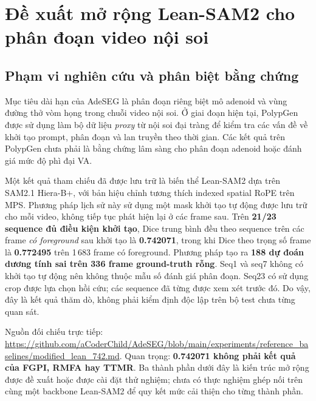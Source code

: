 
\section{Đề xuất mở rộng Lean-SAM2 cho phân đoạn video nội soi}
\label{sec:adeseg-proposed-framework}

\subsection{Phạm vi nghiên cứu và phân biệt bằng chứng}
\label{subsec:adeseg-evidence}

Mục tiêu dài hạn của AdeSEG là phân đoạn riêng biệt mô adenoid và vùng đường
thở vòm họng trong chuỗi video nội soi. Ở giai đoạn hiện tại, PolypGen
\cite{ali2021polypgen} được sử dụng làm bộ dữ liệu \textit{proxy} từ nội soi
đại tràng để kiểm tra các vấn đề về khởi tạo prompt, phân đoạn và lan truyền
theo thời gian. Các kết quả trên PolypGen chưa phải là bằng chứng lâm sàng
cho phân đoạn adenoid hoặc đánh giá mức độ phì đại VA.

Một kết quả tham chiếu đã được lưu trữ là biến thể Lean-SAM2 dựa trên
SAM2.1 Hiera-B+, với bản hiệu chỉnh tương thích indexed spatial RoPE trên
MPS. Phương pháp lịch sử này sử dụng một mask khởi tạo tự động được lưu
trữ cho mỗi video, không tiếp tục phát hiện lại ở các frame sau.
Trên \textbf{21/23 sequence đủ điều kiện khởi tạo}, Dice trung bình đều
theo sequence trên các frame \emph{có foreground} sau khởi tạo là
\textbf{0.742071}, trong khi Dice theo trọng số frame là \textbf{0.772495}
trên 1\,683 frame có foreground. Phương pháp tạo ra \textbf{188 dự đoán
dương tính sai trên 336 frame ground-truth rỗng}. Seq1 và seq7 không có
khởi tạo tự động nên không thuộc mẫu số đánh giá phân đoạn. Seq23 có sử
dụng crop được lựa chọn hồi cứu; các sequence đã từng được xem xét
trước đó. Do vậy, đây là kết quả thăm dò, không phải kiểm định độc lập
trên bộ test chưa từng quan sát.

Nguồn đối chiếu trực tiếp:
\url{https://github.com/aCoderChild/AdeSEG/blob/main/experiments/reference_baselines/modified_lean_742.md}.
Quan trọng: \textbf{0.742071 không phải kết quả của FGPI, RMFA hay TTMR}.
Ba thành phần dưới đây là kiến trúc mở rộng được đề xuất hoặc được cài đặt
thử nghiệm; chưa có thực nghiệm ghép nối trên cùng một backbone Lean-SAM2
để quy kết mức cải thiện cho từng thành phần.


